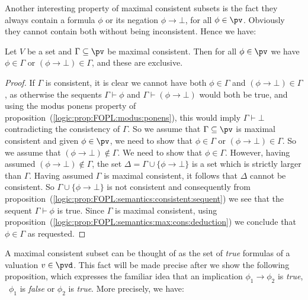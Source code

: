 Another interesting property of maximal consistent subsets is the
fact they always contain a formula $\phi$ or its negation
$\phi\to\bot$, for all $\phi\in\pv$. Obviously they cannot contain
both without being inconsistent. Hence we have:

\begin{prop}\label{logic:prop:FOPL:semantics:max:cons:dychotomy}
Let $V$ be a set and $\Gamma\subseteq\pv$ be maximal consistent.
Then for all $\phi\in\pv$ we have $\phi\in\Gamma$ or
$(\phi\to\bot)\in\Gamma$, and these are exclusive.
\end{prop}
\begin{proof}
If $\Gamma$ is consistent, it is clear we cannot have both
$\phi\in\Gamma$ and $(\phi\to\bot)\in\Gamma$, as otherwise the
sequents $\Gamma\vdash\phi$ and $\Gamma\vdash(\phi\to\bot)$ would
both be true, and using the modus ponens property of
proposition~(\ref{logic:prop:FOPL:modus:ponens}), this would imply
$\Gamma\vdash\bot$ contradicting the consistency of $\Gamma$. So we
assume that $\Gamma\subseteq\pv$ is maximal consistent and given
$\phi\in\pv$, we need to show that $\phi\in\Gamma$ or
$(\phi\to\bot)\in\Gamma$. So we assume that
$(\phi\to\bot)\not\in\Gamma$. We need to show that $\phi\in\Gamma$.
However, having assumed $(\phi\to\bot)\not\in\Gamma$, the set
$\Delta=\Gamma\cup\{\phi\to\bot\}$ is a set which is strictly larger
than $\Gamma$. Having assumed $\Gamma$ is maximal consistent, it
follows that $\Delta$ cannot be consistent. So
$\Gamma\cup\{\phi\to\bot\}$ is not consistent and consequently from
proposition~(\ref{logic:prop:FOPL:semantics:consistent:sequent}) we
see that the sequent $\Gamma\vdash\phi$ is true. Since $\Gamma$ is
maximal consistent, using
proposition~(\ref{logic:prop:FOPL:semantics:max:cons:deduction}) we
conclude that $\phi\in\Gamma$ as requested.
\end{proof}

A maximal consistent subset can be thought of as the set of {\em
true} formulas of a valuation $v\in\pvd$. This fact will be made
precise after we show the following proposition,  which expresses
the familiar idea that an implication $\phi_{1}\to\phi_{2}$ is {\em
true}, \ifand\ $\phi_{1}$ is {\em false} or $\phi_{2}$ is {\em
true}. More precisely, we have:


